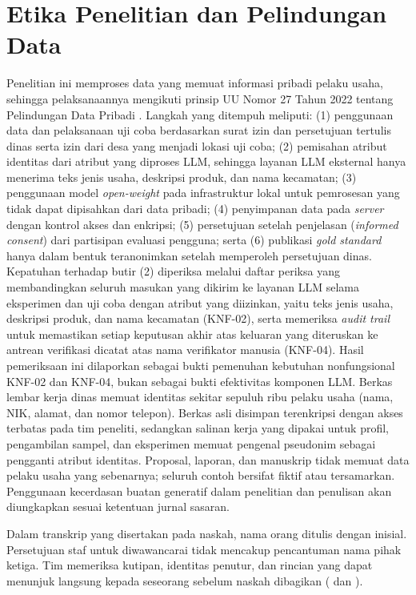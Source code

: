 \section{Etika Penelitian dan Pelindungan Data}
\label{sec:etika}

Penelitian ini memproses data yang memuat informasi pribadi pelaku usaha, sehingga pelaksanaannya mengikuti prinsip UU Nomor 27 Tahun 2022 tentang Pelindungan Data Pribadi \cite{uupdp2022}. Langkah yang ditempuh meliputi: (1) penggunaan data dan pelaksanaan uji coba berdasarkan surat izin dan persetujuan tertulis dinas serta izin dari desa yang menjadi lokasi uji coba; (2) pemisahan atribut identitas dari atribut yang diproses LLM, sehingga layanan LLM eksternal hanya menerima teks jenis usaha, deskripsi produk, dan nama kecamatan; (3) penggunaan model \textit{open-weight} pada infrastruktur lokal untuk pemrosesan yang tidak dapat dipisahkan dari data pribadi; (4) penyimpanan data pada \textit{server} dengan kontrol akses dan enkripsi; (5) persetujuan setelah penjelasan (\textit{informed consent}) dari partisipan evaluasi pengguna; serta (6) publikasi \textit{gold standard} hanya dalam bentuk teranonimkan setelah memperoleh persetujuan dinas. Kepatuhan terhadap butir (2) diperiksa melalui daftar periksa yang membandingkan seluruh masukan yang dikirim ke layanan LLM selama eksperimen dan uji coba dengan atribut yang diizinkan, yaitu teks jenis usaha, deskripsi produk, dan nama kecamatan (KNF-02), serta memeriksa \textit{audit trail} untuk memastikan setiap keputusan akhir atas keluaran yang diteruskan ke antrean verifikasi dicatat atas nama verifikator manusia (KNF-04). Hasil pemeriksaan ini dilaporkan sebagai bukti pemenuhan kebutuhan nonfungsional KNF-02 dan KNF-04, bukan sebagai bukti efektivitas komponen LLM. Berkas lembar kerja dinas memuat identitas sekitar sepuluh ribu pelaku usaha (nama, NIK, alamat, dan nomor telepon). Berkas asli disimpan terenkripsi dengan akses terbatas pada tim peneliti, sedangkan salinan kerja yang dipakai untuk profil, pengambilan sampel, dan eksperimen memuat pengenal pseudonim sebagai pengganti atribut identitas. Proposal, laporan, dan manuskrip tidak memuat data pelaku usaha yang sebenarnya; seluruh contoh bersifat fiktif atau tersamarkan. Penggunaan kecerdasan buatan generatif dalam penelitian dan penulisan akan diungkapkan sesuai ketentuan jurnal sasaran.

Dalam transkrip yang disertakan pada naskah, nama orang ditulis dengan inisial. Persetujuan staf untuk diwawancarai tidak mencakup pencantuman nama pihak ketiga. Tim memeriksa kutipan, identitas penutur, dan rincian yang dapat menunjuk langsung kepada seseorang sebelum naskah dibagikan (\lampstaf{} dan \lampkadis).

